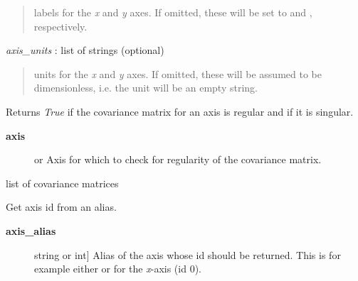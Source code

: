 \documentclass[a4paper,10pt,english]{sphinxmanual}
\begin{document}
\begin{fulllineitems}
\begin{quote}
labels for the \emph{x} and \emph{y} axes. If omitted, these will be set to
 and , respectively.
\end{quote}

\emph{axis\_units} : list of strings (optional)
\begin{quote}

units for the \emph{x} and \emph{y} axes. If omitted, these will be assumed to be
dimensionless, i.e. the unit will be an empty string.
\end{quote}

\begin{fulllineitems}
\label{index:kafe.dataset.Dataset.cov_mat_is_regular}
Returns \emph{True} if the covariance matrix for an axis is regular and
 if it is singular.
\begin{description}
\item[{\textbf{axis}}] \leavevmode{[} or \code{'y'}{]}
Axis for which to check for regularity of the covariance matrix.

\end{description}

\end{fulllineitems}


\begin{fulllineitems}
\label{index:kafe.dataset.Dataset.cov_mats}
list of covariance matrices

\end{fulllineitems}


\begin{fulllineitems}
\label{index:kafe.dataset.Dataset.get_axis}
Get axis id from an alias.
\begin{description}
\item[{\textbf{axis\_alias}}] \leavevmode{[}string or int{]}
Alias of the axis whose id should be returned. This is for example
either  or  for the \emph{x}-axis (id 0).

\end{description}

\end{fulllineitems}


\end{fulllineitems}
\end{document}
